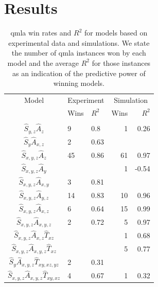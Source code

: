 \section{Results}
\begin{table}[h]
    \centering
    \begin{tabular}{cllrr}
    \hline
     Model & \multicolumn{2}{c}{Experiment} & \multicolumn{2}{c}{Simulation}    \\
     & Wins   & $R^2$   & Wins   & $R^2$   \\
    \hline
    \\
     $\hat{S}_{y,z}\hat{A}_{z}$                      & 9      & 0.8     & 1      & 0.26    \\
     $\hat{S}_{y}\hat{A}_{x,z}$                      & 2      & 0.63    &        &         \\
     $\hat{S}_{x,y,z}\hat{A}_{z}$                    & 45     & 0.86    & 61     & 0.97    \\
     $\hat{S}_{x,y,z}\hat{A}_{y}$                    &        &         & 1      & -0.54   \\
     $\hat{S}_{x,y,z}\hat{A}_{x,y}$                  & 3      & 0.81    &        &         \\
     $\hat{S}_{x,y,z}\hat{A}_{y,z}$                  & 14     & 0.83    & 10     & 0.96    \\
     $\hat{S}_{x,y,z}\hat{A}_{x,z}$                  & 6      & 0.64    & 15     & 0.99    \\
     $\hat{S}_{x,y,z}\hat{A}_{x,y,z}$                & 2      & 0.72    & 5      & 0.97    \\
     $\hat{S}_{x,y,z}\hat{A}_{x,z}\hat{T}_{xz}$      &        &         & 1      & 0.68    \\
     $\hat{S}_{x,y,z}\hat{A}_{x,y,z}\hat{T}_{xz}$    &        &         & 5      & 0.77    \\
     $\hat{S}_{y}\hat{A}_{x,y,z}\hat{T}_{xy,xz,yz}$  & 2      & 0.31    &        &         \\
     $\hat{S}_{x,y,z}\hat{A}_{x,y,z}\hat{T}_{xy,xz}$ & 4      & 0.67    & 1      & 0.32    \\
    \hline
    \end{tabular}
    \caption[
        \gls{qmla} win rates and $R^2$ for models based on experimental data and simulations. 
    ]{
        \gls{qmla} win rates and $R^2$ for models based on experimental data and simulations. 
        We state the number of \gls{qmla} instances won by each model and the average $R^2$ for those instances as an indication of the
        predictive power of winning models.
    }
    \label{table:win_rates_r_squareds}
\end{table}

